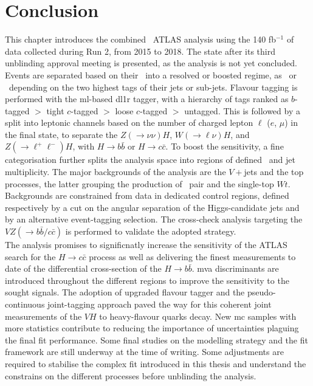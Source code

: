 \section{Conclusion}
This chapter introduces the combined \vhbc\ ATLAS analysis using the 140 fb$^{-1}$ of data collected during Run 2, from 2015 to 2018. The state after its third unblinding approval meeting is presented, as the analysis is not yet concluded. Events are separated based on their \ptv\ into a resolved or boosted regime, as \vhb\ or \vhc\ depending on the two highest tags of their jets or sub-jets. Flavour tagging is performed with the \gls{ml}-based \gls{dl1r} tagger, with a hierarchy of tags ranked as $b$-tagged $>$ tight $c$-tagged $>$ loose $c$-tagged $>$ untagged. This is followed by a split into leptonic channels based on the number of charged lepton $\ell$ ($e$, $\mu$) in the final state, to separate the $Z(\rightarrow \nu\nu)H$, $W(\rightarrow \ell\nu)H$, and $Z(\rightarrow \ell^+\ell^-)H$, with $H \rightarrow b\bar{b}$ or $H \rightarrow c\bar{c}$. To boost the sensitivity, a fine categorisation further splits the analysis space into regions of defined \ptv\ and jet multiplicity. The major backgrounds of the analysis are the $V+$jets and the top processes, the latter grouping the production of \ttb\ pair and the single-top $Wt$. Backgrounds are constrained from data in dedicated control regions, defined respectively by a cut on the angular separation of the Higgs-candidate jets and by an alternative event-tagging selection. The cross-check analysis targeting the $VZ (\rightarrow b\bar{b}/c\bar{c})$ is performed to validate the adopted strategy. \\

The analysis promises to significnatly increase the sensitivity of the ATLAS search for the $H\rightarrow c\bar{c}$ process as well as delivering the finest measurements to date of the differential cross-section of the $H\rightarrow b\bar{b}$. \gls{mva} discriminants are introduced throughout the different regions to improve the sensitivity to the sought signals. The adoption of upgraded flavour tagger and the pseudo-continuous joint-tagging approach paved the way for this coherent joint measurements of the $VH$ to heavy-flavour quarks decay. New \gls{mc} samples with more statistics contribute to reducing the importance of uncertainties plaguing the final fit performance. Some final studies on the modelling strategy and the fit framework are still underway at the time of writing. Some adjustments are required to stabilise the complex fit introduced in this thesis and understand the constrains on the different processes before unblinding the analysis.\\

